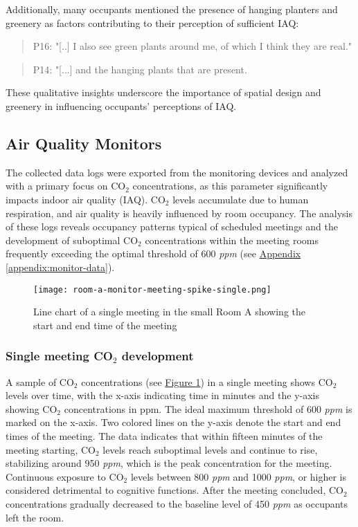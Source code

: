 Additionally, many occupants mentioned the presence of hanging planters and greenery as factors contributing to their perception of sufficient IAQ:

\begin{quote}
P16: "[..] I also see green plants around me, of which I think they are real."
\end{quote}

\begin{quote}
P14: "[...] and the hanging plants that are present.
\end{quote}

These qualitative insights underscore the importance of spatial design and greenery in influencing occupants' perceptions of IAQ.

\subsection{Air Quality Monitors}
\label{sec:monitor_analysis}

The collected data logs were exported from the monitoring devices and analyzed with a primary focus on CO$_{2}$ concentrations, as this parameter significantly impacts indoor air quality (IAQ). CO$_{2}$ levels accumulate due to human respiration, and air quality is heavily influenced by room occupancy. The analysis of these logs reveals occupancy patterns typical of scheduled meetings and the development of suboptimal CO$_{2}$ concentrations within the meeting rooms frequently exceeding the optimal threshold of 600 \textit{ppm} (see \hyperref[appendix:monitor-data]{Appendix \ref*{appendix:monitor-data}}).

\begin{figure}[h]
    \centering
    \texttt{[image: room-a-monitor-meeting-spike-single.png]}
    \caption{Line chart of a single meeting in the small Room A showing the start and end time of the meeting}
    \label{fig:room-a-spike}
\end{figure}

\subsubsection{Single meeting CO$_{2}$ development}

A sample of CO$_{2}$ concentrations (see \hyperref[fig:room-a-spike]{Figure \ref*{fig:room-a-spike}}) in a single meeting shows CO$_{2}$ levels over time, with the x-axis indicating time in minutes and the y-axis showing CO$_{2}$ concentrations in ppm. The ideal maximum threshold of 600 \textit{ppm} is marked on the x-axis. Two colored lines on the y-axis denote the start and end times of the meeting. The data indicates that within fifteen minutes of the meeting starting, CO$_{2}$ levels reach suboptimal levels and continue to rise, stabilizing around 950 \textit{ppm}, which is the peak concentration for the meeting. Continuous exposure to CO$_{2}$ levels between 800 \textit{ppm} and 1000 \textit{ppm}, or higher is considered detrimental to cognitive functions. After the meeting
concluded, CO$_{2}$ concentrations gradually decreased to the baseline
level of 450 \textit{ppm} as occupants left the room.

